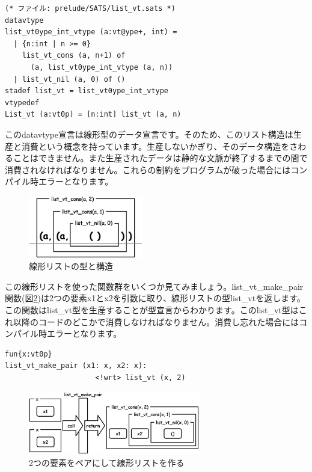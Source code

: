 \documentclass{ipsjprosym}
\begin{document}
\vspace{3mm}
\begin{verbatim}
(* ファイル: prelude/SATS/list_vt.sats *)
datavtype
list_vt0ype_int_vtype (a:vt@ype+, int) =
  | {n:int | n >= 0}
    list_vt_cons (a, n+1) of
      (a, list_vt0ype_int_vtype (a, n))
  | list_vt_nil (a, 0) of ()
stadef list_vt = list_vt0ype_int_vtype
vtypedef
List_vt (a:vt0p) = [n:int] list_vt (a, n)
\end{verbatim}
\vspace{3mm}

このdatavtype宣言は線形型のデータ宣言です。そのため、このリスト構造は生産と消費という概念を持っています。生産しないかぎり、そのデータ構造をさわることはできません。また生産されたデータは静的な文脈が終了するまでの間で消費されなければなりません。これらの制約をプログラムが破った場合にはコンパイル時エラーとなります。

\begin{figure}[h]
\centering
\includegraphics[width=50mm]{draw/list_vt_type.eps}
\caption{線形リストの型と構造}
\label{fig:list_vt_type}
\end{figure}

この線形リストを使った関数群をいくつか見てみましょう。list\_vt\_make\_pair関数(図\ref{fig:list_vt_make_pair})は2つの要素x1とx2を引数に取り、線形リストの型list\_vtを返します。この関数はlist\_vt型を生産することが型宣言からわかります。このlist\_vt型はこれ以降のコードのどこかで消費しなければなりません。消費し忘れた場合にはコンパイル時エラーとなります。

\vspace{3mm}
\begin{verbatim}
fun{x:vt0p}
list_vt_make_pair (x1: x, x2: x):
                     <!wrt> list_vt (x, 2)
\end{verbatim}
\vspace{3mm}

\begin{figure}[h]
\centering
\includegraphics[width=75mm]{draw/list_vt_make_pair.eps}
\caption{2つの要素をペアにして線形リストを作る}
\label{fig:list_vt_make_pair}
\end{figure}
\end{document}
